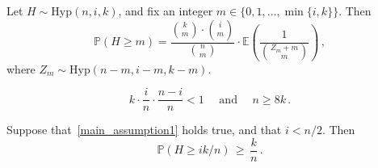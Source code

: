 \documentclass[10pt,a4paper]{amsart}
\begin{document}
\begin{lemma}\label{clean_form}
Let $H\sim\text{Hyp}(n,i,k)$, 
and fix an integer $m\in \{0,1,\ldots,\min\{i,k\}\}$. 
Then 
\begin{equation}\label{clean_form1}
\mathbb{P}(H \ge m) = \frac{\binom{k}{m}\cdot \binom{i}{m}}{\binom{n}{m}} \cdot \mathbb{E}\left(\frac{1}{\binom{Z_m+m}{m}} \right) \, ,
\end{equation}
where $Z_m\sim\text{Hyp}(n-m,i-m,k-m)$. 
\end{lemma}

\begin{equation}\label{main_assumption1}
k\cdot\frac{i}{n}\cdot \frac{n-i}{n}< 1 \quad \text{ and } \quad n\ge 8k \, .
\end{equation}

\begin{lemma}\label{mms1}
Suppose that~\eqref{main_assumption1} holds true, and that  $i<n/2$.  
Then  
\[
\mathbb{P}(H \ge ik/n) \, \ge \, \frac{k}{n} \, .
\]
\end{lemma}
\end{document}
